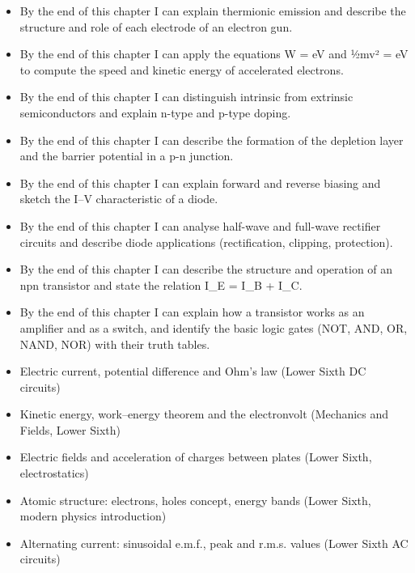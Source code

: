 \documentclass[11pt]{article}
\begin{document}
\begin{objectifs}
\begin{itemize}
\item By the end of this chapter I can explain thermionic emission and describe the structure and role of each electrode of an electron gun.
\item By the end of this chapter I can apply the equations W = eV and ½mv² = eV to compute the speed and kinetic energy of accelerated electrons.
\item By the end of this chapter I can distinguish intrinsic from extrinsic semiconductors and explain n-type and p-type doping.
\item By the end of this chapter I can describe the formation of the depletion layer and the barrier potential in a p-n junction.
\item By the end of this chapter I can explain forward and reverse biasing and sketch the I–V characteristic of a diode.
\item By the end of this chapter I can analyse half-wave and full-wave rectifier circuits and describe diode applications (rectification, clipping, protection).
\item By the end of this chapter I can describe the structure and operation of an npn transistor and state the relation I\_E = I\_B + I\_C.
\item By the end of this chapter I can explain how a transistor works as an amplifier and as a switch, and identify the basic logic gates (NOT, AND, OR, NAND, NOR) with their truth tables.
\end{itemize}
\end{objectifs}

\begin{prerequis}
\begin{itemize}
\item Electric current, potential difference and Ohm's law (Lower Sixth DC circuits)
\item Kinetic energy, work–energy theorem and the electronvolt (Mechanics and Fields, Lower Sixth)
\item Electric fields and acceleration of charges between plates (Lower Sixth, electrostatics)
\item Atomic structure: electrons, holes concept, energy bands (Lower Sixth, modern physics introduction)
\item Alternating current: sinusoidal e.m.f., peak and r.m.s. values (Lower Sixth AC circuits)
\end{itemize}
\end{prerequis}
\end{document}
